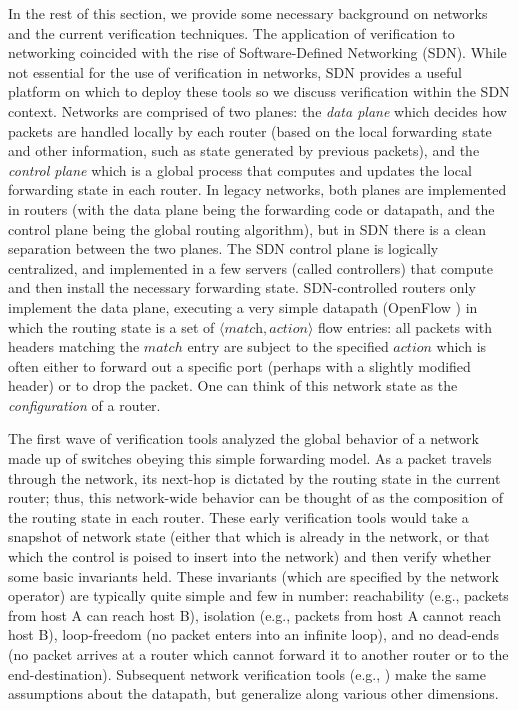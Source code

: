In the rest of this section, we provide some necessary background on networks and the current verification techniques. The application of verification to networking coincided with the rise of Software-Defined Networking (SDN). While not essential for the use of verification in networks, SDN provides a useful platform on which to deploy these tools so we discuss verification within the SDN context. Networks are comprised of two planes: the {\em data plane} which decides how packets are handled locally by each router (based on the local forwarding state and other information, such as state generated by previous packets), and the {\em control plane} which is a global process that computes and updates the local forwarding state in each router. In legacy networks, both planes are implemented in routers (with the data plane being the forwarding code or datapath, and the control plane being the global routing algorithm), but in SDN there is a clean separation between the two planes. The SDN control plane is logically centralized, and implemented in a few servers (called controllers) that compute and then install the necessary forwarding state. SDN-controlled routers only implement the data plane, executing a very simple datapath (OpenFlow \cite{openflow}) in which the routing state is a set of
$\langle \textit{match}, \textit{action} \rangle$ flow entries: all packets with headers matching the $match$ entry are subject to the specified $action$ which is often either to forward out a specific port (perhaps with a slightly modified header) or to drop the packet.
One can think of this network state as the {\em configuration} of a router.

The first wave of verification tools \cite{anteater,khurshid2012veriflow,oldhsa,kazemian2013real} analyzed the global behavior of a network made up of switches obeying this simple forwarding model. As a packet travels through the network, its next-hop is dictated by the routing state in the current router; thus, this network-wide behavior can be thought of as the composition of the routing state in each router. These early verification tools would take a snapshot of network state (either that which is already in the network, or that which the control is poised to insert into the network) and then verify whether some basic invariants held. These invariants (which are specified by the network operator) are typically quite simple and few in number: reachability (e.g., packets from host A can reach host B), isolation (e.g., packets from host A cannot reach host B), loop-freedom (no packet enters into an infinite loop), and no dead-ends (no packet arrives at a router which cannot forward it to another router or to the end-destination). Subsequent network verification tools (e.g., \cite{guha2013machine,anderson2014netkat,flowlog, nelson2013balance}) make the same assumptions about the datapath, but generalize along various other dimensions.

